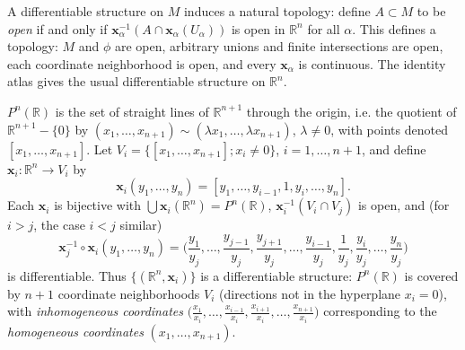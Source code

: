 \begin{remark}
  \label{rem:dc-ch0-2-3}


  A differentiable structure on $M$ induces a natural topology: define $A\subset M$
  to be \emph{open} if and only if $\mathbf{x}_\alpha^{-1}(A\cap\mathbf{x}_\alpha(U_\alpha))$
  is open in $\mathbb{R}^n$ for all $\alpha$. This defines a topology: $M$ and $\phi$
  are open, arbitrary unions and finite intersections are open, each coordinate
  neighborhood is open, and every $\mathbf{x}_\alpha$ is continuous. The identity
  atlas gives the usual differentiable structure on $\mathbb{R}^n$.
\end{remark}

\begin{example}
  \label{ex:dc-ch0-2-4}


  $P^n(\mathbb{R})$ is the set of straight lines of $\mathbb{R}^{n+1}$ through the
  origin, i.e. the quotient of $\mathbb{R}^{n+1}-\{0\}$ by
  $(x_1,\dots,x_{n+1})\sim(\lambda x_1,\dots,\lambda x_{n+1})$, $\lambda\neq0$,
  with points denoted $[x_1,\dots,x_{n+1}]$. Let
  $V_i=\{[x_1,\dots,x_{n+1}]; x_i\neq0\}$, $i=1,\dots,n+1$, and define
  $\mathbf{x}_i:\mathbb{R}^n\to V_i$ by
  $$
  \mathbf{x}_i(y_1,\dots,y_n)=[y_1,\dots,y_{i-1},1,y_i,\dots,y_n].
  $$
  Each $\mathbf{x}_i$ is bijective with $\bigcup\mathbf{x}_i(\mathbb{R}^n)=P^n(\mathbb{R})$,
  $\mathbf{x}_i^{-1}(V_i\cap V_j)$ is open, and (for $i>j$, the case $i<j$ similar)
  $$
  \mathbf{x}_j^{-1}\circ\mathbf{x}_i(y_1,\dots,y_n)=\Big(\frac{y_1}{y_j},\dots,\frac{y_{j-1}}{y_j},\frac{y_{j+1}}{y_j},\dots,\frac{y_{i-1}}{y_j},\frac{1}{y_j},\frac{y_i}{y_j},\dots,\frac{y_n}{y_j}\Big)
  $$
  is differentiable. Thus $\{(\mathbb{R}^n,\mathbf{x}_i)\}$ is a differentiable
  structure: $P^n(\mathbb{R})$ is covered by $n+1$ coordinate neighborhoods $V_i$
  (directions not in the hyperplane $x_i=0$), with \emph{inhomogeneous coordinates}
  $\big(\frac{x_1}{x_i},\dots,\frac{x_{i-1}}{x_i},\frac{x_{i+1}}{x_i},\dots,\frac{x_{n+1}}{x_i}\big)$
  corresponding to the \emph{homogeneous coordinates} $(x_1,\dots,x_{n+1})$.
\end{example}


